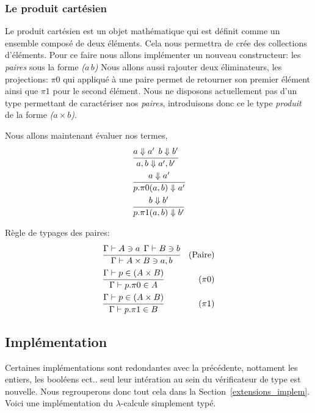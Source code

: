\documentclass {article}
\theoremstyle{definition}
\theoremstyle{remark}
\begin{document}
\subsubsection{Le produit cartésien}
\label{produit_cartesien}

Le produit cartésien est un objet mathématique qui est définit comme
un ensemble composé de deux éléments.
Cela nous permettra de crée des collections d'éléments. 
Pour ce faire nous allons implémenter un nouveau constructeur:
les \emph{paires} sous la forme \emph{($a\,b$)}
Nous allons aussi rajouter deux éliminateurs, les projections:
\emph{$\pi 0$} qui appliqué à une paire 
permet de retourner son premier élément ainsi que \emph{$\pi 1$} pour le second élément.
Nous ne disposons actuellement pas d'un type permettant de caractériser nos \emph{paires},
introduisons donc ce le type \emph{produit} de la forme \emph{($a\times b$)}.

Nous allons maintenant évaluer nos termes, 
\begin{align*}
  &\cfrac{a \Downarrow a' \:\: b\Downarrow b'}
  {a,b \Downarrow a',b'}\\
  &\cfrac{a\Downarrow a'}
  {p.\pi0(a,b)\Downarrow a'}\\
  &\cfrac{b\Downarrow b'}
  {p.\pi1(a,b)\Downarrow b'}\\
\end{align*}


Règle de typages des paires:
\begin{align*}
  &\cfrac{\Gamma\vdash A\ni a \:\: \Gamma\vdash B\ni b}
  {\Gamma\vdash A\times B \ni a,b}&\mbox{(Paire)} \\
  &\cfrac{\Gamma\vdash p \in (A\times B)} 
  {\Gamma\vdash p.\pi 0 \in A}&\mbox{($\pi 0$)} \\
  &\cfrac{\Gamma\vdash p \in (A\times B)} 
  {\Gamma\vdash p.\pi 1 \in B}&\mbox{($\pi 1$)} \\
\end{align*}


\subsection{Implémentation}

Certaines implémentations sont redondantes avec la précédente, nottament les 
entiers, les booléens ect.. seul leur intération au sein du vérificateur de type
est nouvelle. Nous regrouperons donc tout cela dans la Section~\ref{extensions_implem}.
Voici une implémentation du $\lambda$-calcule simplement typé.
\end{document}
